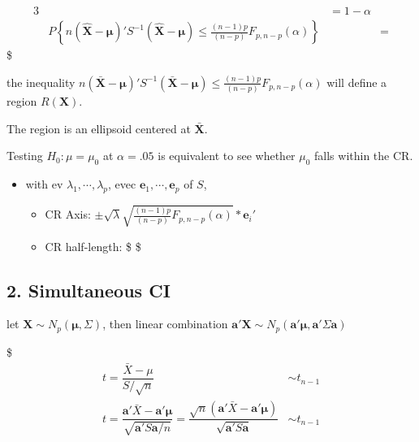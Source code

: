 \documentclass[
]{book}
\providecommand{\tightlist}{%
  \setlength{\itemsep}{0pt}\setlength{\parskip}{0pt}}
\begin{document}
{{{\begin{alignat*}{3}
&&= 1-\alpha \\




&P \left\{

n (\hat {\pmb X} - \pmb \mu)' S^{-1}(\hat {\pmb X} - \pmb \mu) \le \tfrac{(n-1)p}{(n-p)} F_{p,n-p} (\alpha)

\right\}

&&=



\end{alignat*}
\$

the inequality \(n (\bar {\pmb X} - \pmb \mu)' S^{-1}(\bar {\pmb X} - \pmb \mu) \le \tfrac{(n-1)p}{(n-p)} F_{p,n-p} (\alpha)\) will define a region \(R(\pmb X)\).

The region is an ellipsoid centered at \(\bar {\pmb X}\).

Testing \(H_0 : \mu = \mu_0\) at \(\alpha =.05\) is equivalent to see whether \(\mu_0\) falls within the CR.

\begin{itemize}
\tightlist
\item
  with ev \(\lambda_1 , \cdots, \lambda_p\), evec \(\pmb e_1 , \cdots, \pmb e_p\) of \(S\),

  \begin{itemize}
  \tightlist
  \item
    CR Axis: \(\pm \sqrt{\lambda}\sqrt{\tfrac{(n-1)p}{(n-p)} F_{p,n-p} (\alpha)} \ast \pmb e_i'\)
  \item
    CR half-length: \$ \sqrt{\lambda}\$
  \end{itemize}
\end{itemize}

\hypertarget{simultaneous-ci}{%
\subsection{2. Simultaneous CI}\label{simultaneous-ci}}

let \(\pmb X \sim N_p (\pmb \mu, \Sigma)\), then linear combination \(\pmb a' \pmb X \sim N_p (\pmb a' \pmb \mu, \pmb a' \Sigma \pmb a)\)

\$
\begin{align*}

t=\dfrac{\bar X - \mu} {S / \sqrt{n}} &\sim t_{n-1} \tag{recall: univariate}\\

t= \dfrac {\pmb a ' \bar X - \pmb a ' \pmb \mu} {\sqrt{\pmb a ' S \pmb a / n } } = \dfrac {\sqrt{n}(\pmb a ' \bar X - \pmb a ' \pmb \mu)} {\sqrt{\pmb a ' S \pmb a} } &\sim t_{n-1} \tag{MV}


\end{align*}}}}
\end{document}
